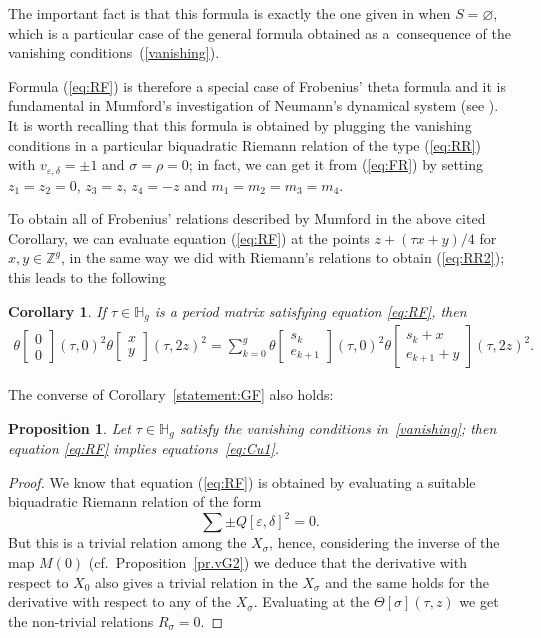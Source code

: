 \documentclass[11pt]{article}
\numberwithin{equation}{section}
\numberwithin{equation}{section}
\newtheorem{Corollary}[Theorem]{Corollary}
\newtheorem{Proposition}[Theorem]{Proposition}
{ \theoremstyle{definition}
\newtheorem{Remark}[Theorem]{Remark} }
\newcommand{\de}{\delta}
\newcommand{\ep}{\varepsilon}
\newcommand{\HH}{{\mathbb{H}}}
\newcommand{\ZZ}{{\mathbb{Z}}}
\def\ZZ{{\mathbb Z}}
\def\t{\theta}
\def\s{\sigma}
\def\T{\Theta}
\def\tt#1#2{{\t\left[\begin{matrix}{#1}\\ {#2}\end{matrix}\right]}}
\begin{document}
\begin{Remark} The important fact is that this formula is exactly the one given in \cite[Corollary~7.5, p.~113]{mu} when $S=\varnothing$, which is a particular case of the general formula obtained as a~consequence of the vanishing conditions~(\ref{vanishing}).
 \end{Remark}

Formula (\ref{eq:RF}) is therefore a special case of Frobenius' theta formula and it is fundamental in Mumford's investigation of Neumann's dynamical system (see \cite[Lemma~9.7]{mu}). It is worth recalling that this formula is obtained by plugging the vanishing conditions in a particular biquadratic Riemann relation of the type (\ref{eq:RR}) with $v_{\ep,\de}=\pm 1$ and $\s=\rho=0$; in fact, we can get it from (\ref{eq:FR}) by setting $z_1=z_2=0$, $z_3=z$, $z_4=-z$ and $ m_1=m_2=m_3=m_4.$

To obtain all of Frobenius' relations described by Mumford in the above cited Corollary, we can evaluate equation (\ref{eq:RF}) at the points $z+(\tau x+y)/4$ for $x,y \in\ZZ^g$, in the same way we did with Riemann's relations to obtain (\ref{eq:RR2}); this leads to the following
\begin{Corollary} If $\tau\in \HH_g$ is a period matrix
satisfying equation \eqref{eq:RF}, then
\begin{gather}\label{eq:RF2}
 \tt{0}{0}(\tau,0)^2\tt{x}{y }(\tau, 2z)^2 =\sum_{k=0}^g \tt{s_k}{e_{k+1}}(\tau,0)^2\tt{s_k+x}{e_{k+1}+y }(\tau, 2z)^2 .
\end{gather}
\end{Corollary}

The converse of Corollary~\ref{statement:GF} also holds:

 \begin{Proposition}\label{statement:FG} Let $\tau\in\HH_g$ satisfy the vanishing conditions in~\eqref{vanishing}; then equation \eqref{eq:RF} implies equations~\eqref{eq:Cu1}.
 \end{Proposition}
 \begin{proof}We know that equation (\ref{eq:RF}) is obtained by evaluating a suitable biquadratic Riemann relation of the form
 \[
\sum \pm Q[\ep, \de]^2 =0.
\]
But this is a trivial relation among the $X_{\s}$, hence, considering the inverse of the map $M(0)$ (cf.\ Proposition~\ref{pr.vG2}) we deduce that the derivative with respect to $X_0$ also gives a trivial relation in the $X_{\s}$ and the same holds for the derivative with respect to any of the $X_{\s}$. Evaluating at the $\T[\s](\tau, z)$ we get the non-trivial relations $R_{\s}=0$.
\end{proof}
\end{document}
